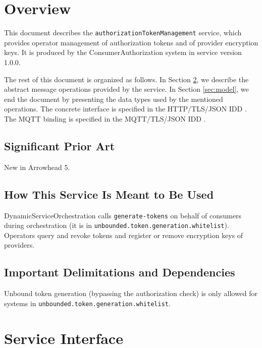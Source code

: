 \documentclass[a4paper]{arrowhead}
\begin{document}
\section{Overview}
\label{sec:overview}

This document describes the \texttt{authorization\allowbreak{}Token\allowbreak{}Management} service, which provides operator management of authorization tokens and of provider encryption keys.
It is produced by the ConsumerAuthorization system \cite{ca-sysd} in service version 1.0.0.

The rest of this document is organized as follows.
In Section \ref{sec:operations}, we describe the abstract message operations provided by the service.
In Section \ref{sec:model}, we end the document by presenting the data types used by the mentioned operations.
The concrete interface is specified in the HTTP/TLS/JSON IDD \cite{ca-authorizationTokenManagement-http-idd}. The MQTT binding is specified in the MQTT/TLS/JSON IDD \cite{ca-authorizationTokenManagement-mqtt-idd}.

\subsection{Significant Prior Art}

New in Arrowhead 5.

\subsection{How This Service Is Meant to Be Used}

Dynamic\allowbreak{}Service\allowbreak{}Orchestration calls \texttt{generate-\allowbreak{}tokens} on behalf of consumers during orchestration (it is in \texttt{unbounded.\allowbreak{}token.\allowbreak{}generation.\allowbreak{}whitelist}). Operators query and revoke tokens and register or remove encryption keys of providers.

\subsection{Important Delimitations and Dependencies}
\label{sec:delimitations}

Unbound token generation (bypassing the authorization check) is only allowed for systems in \texttt{unbounded.\allowbreak{}token.\allowbreak{}generation.\allowbreak{}whitelist}.

\newpage

\section{Service Interface}
\label{sec:operations}
\end{document}
